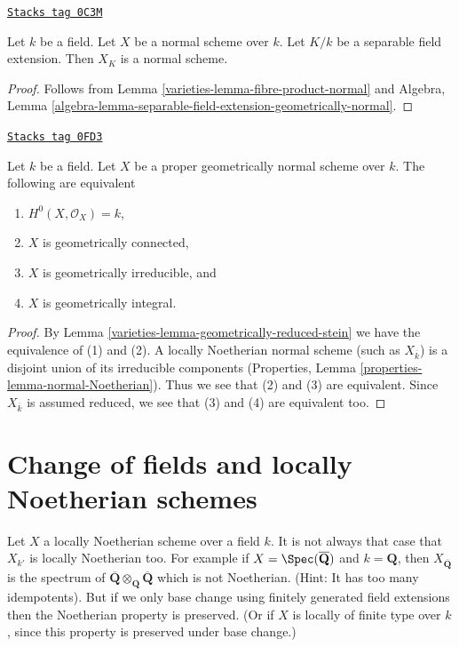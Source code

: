 \begin{lemma}
\label{varieties-lemma-base-change-normal-by-separable}
\href{https://stacks.math.columbia.edu/tag/0C3M}{\texttt{Stacks tag 0C3M}}

Let $k$ be a field. Let $X$ be a normal scheme over $k$. Let $K/k$
be a separable field extension. Then $X_K$ is a normal scheme.
\end{lemma}

\begin{proof}

Follows from Lemma \ref{varieties-lemma-fibre-product-normal} and
Algebra, Lemma
\ref{algebra-lemma-separable-field-extension-geometrically-normal}.
\end{proof}

\begin{lemma}
\label{varieties-lemma-geometrically-normal-stein}
\href{https://stacks.math.columbia.edu/tag/0FD3}{\texttt{Stacks tag 0FD3}}

Let $k$ be a field. Let $X$ be a proper geometrically normal scheme over $k$.
The following are equivalent
\begin{enumerate}
\item $H^0(X, \mathcal{O}_X) = k$,
\item $X$ is geometrically connected,
\item $X$ is geometrically irreducible, and
\item $X$ is geometrically integral.
\end{enumerate}
\end{lemma}

\begin{proof}

By Lemma \ref{varieties-lemma-geometrically-reduced-stein} we have the
equivalence of (1) and (2). A locally Noetherian normal scheme
(such as $X_{\overline{k}}$) is a disjoint union of
its irreducible components
(Properties, Lemma \ref{properties-lemma-normal-Noetherian}).
Thus we see that (2) and (3) are equivalent.
Since $X_{\overline{k}}$ is assumed reduced, we see that
(3) and (4) are equivalent too.
\end{proof}

\section{Change of fields and locally Noetherian schemes}
\label{varieties-section-locally-Noetherian}
Let $X$ a locally Noetherian scheme over a field $k$.
It is not always that case that $X_{k'}$ is locally Noetherian too.
For example if $X = \Spec(\overline{\mathbf{Q}})$ and
$k = \mathbf{Q}$, then $X_{\overline{\mathbf{Q}}}$ is the spectrum
of $\overline{\mathbf{Q}} \otimes_{\mathbf{Q}} \overline{\mathbf{Q}}$
which is not Noetherian. (Hint: It has too many idempotents).
But if we only base change using finitely generated field extensions
then the Noetherian property is preserved. (Or if $X$ is locally of finite
type over $k$, since this property is preserved under base change.)

